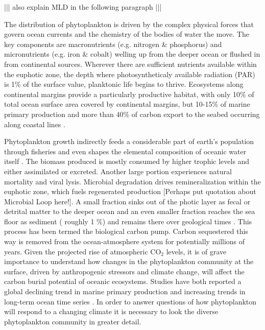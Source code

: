 ||| also explain MLD in the following paragraph |||

The distribution of phytoplankton is driven by the complex physical forces that govern ocean currents and the chemistry of the bodies of water the move. The key components are macronutrients (e.g. nitrogen \& phosphorus) and micronutrients (e.g. iron \& cobalt) welling up from the deeper ocean or flushed in from continental sources. Wherever there are sufficient nutrients available within the euphotic zone, the depth where photosyntheticaly available radiation (PAR) is 1\% of the surface value, planktonic life begins to thrive. Ecosystems along continental margins provide a particularly productive habitat, with only 10\% of total ocean surface area covered by continental margins, but 10-15\% of marine primary production and more than 40\% of carbon export to the seabed occurring along coastal lines \citep{Yool2001,Muller-Karger2005}.


Phytoplankton growth indirectly feeds a considerable part of earth’s population through fisheries \citep{Stock2017} and even shapes the elemental composition of oceanic water itself \citep{Redfield1958}. 
The biomass produced is mostly consumed by higher trophic levels and either assimilated or excreted. Another large portion experiences natural mortality and viral lysis. Microbial degradation drives remineralization within the euphotic zone, which fuels regenerated production \citep{Eppley1979} [Perhaps put quotation about Microbial Loop here!]. 
A small fraction sinks out of the photic layer as fecal or detrital matter to the deeper ocean and an even smaller fraction reaches the sea floor as sediment ( roughly 1 \%) and remains there over geological times \citep{Honjo2008}. This process has been termed the biological carbon pump. Carbon sequestered this way is removed from the ocean-atmosphere system for potentially millions of years. Given the projected rise of atmospheric CO$_2$ levels, it is of grave importance to understand how changes in the phytoplankton community at the surface, driven by anthropogenic stressors and climate change, will affect the carbon burial potential of oceanic ecosystems. 
Studies have both reported a global declining trend in marine primary production \citep{Boyce2012} and increasing trends in long-term ocean time series \citep{Chavez2011a}. 
In order to answer questions of how phytoplankton will respond to a changing climate it is necessary to look the diverse phytoplankton community in greater detail. 

